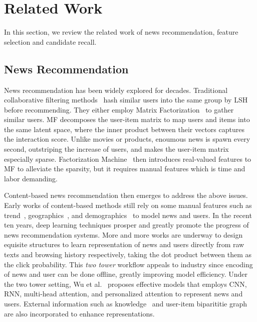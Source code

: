 \documentclass[sigconf,anonymous]{acmart}
\begin{document}








\section{Related Work}
\label{section:related work}
In this section, we review the related work of news recommendation, feature selection and candidate recall.
\subsection{News Recommendation}
News recommendation has been widely explored for decades. Traditional collaborative filtering methods~\cite{das_CF, li_SCENE} hash similar users into the same group by LSH before recommending. They either employ Matrix Factorization~\cite{koren_MF} to gather similar users. MF decomposes the user-item matrix to map users and items into the same latent space, where the inner product between their vectors captures the interaction score. Unlike movies or products, enoumous news is spawn every second, outstriping the increase of users, and makes the user-item matrix especially sparse. Factorization Machine~\cite{rendle_FM} then introduces real-valued features to MF to alleviate the sparsity, but it requires manual features which is time and labor demanding.

Content-based news recommendation then emerges to address the above issues. Early works of content-based methods still rely on some manual features such as trend~\cite{liu_bayesian_news_trend}, geographics~\cite{li_contextual_bandit}, and demographics~\cite{cheng_Wide&Deep} to model news and users. In the recent ten years, deep learning techniques prosper and greatly promote the progress of news recommendation systems. More and more works are underway to design equisite structures to learn representation of news and users directly from raw texts and browsing history respectively, taking the dot product between them as the click probability. This \emph{two tower} workflow appeals to industry since encoding of news and user can be done offline, greatly improving model efficiency. Under the two tower setting, Wu et al.~\cite{wu_GNN,wu_heterogeneous,wu_LSTUR,wu_NAML,wu_NPA,wu_NRMS,wu_topic-aware} proposes effective models that employs CNN, RNN, multi-head attention, and personalized attention to represent news and users. External information such as knowledge~\cite{wang_DKN} and user-item biparititie graph~\cite{wu_GNN,hu_GNN_disentanglement} are also incorporated to enhance representations.
\end{document}
